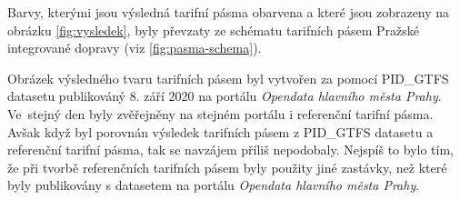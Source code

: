 Barvy, kterými jsou výsledná tarifní pásma obarvena a které jsou zobrazeny na obrázku \ref{fig:vysledek}, byly převzaty
ze schématu tarifních pásem Pražské integrované dopravy (viz \ref{fig:pasma-schema}).  

Obrázek výsledného tvaru tarifních pásem byl vytvořen za pomocí PID\_GTFS datasetu publikováný 8. září 2020 na portálu \textit{Opendata
hlavního města Prahy}. Ve~stejný den byly zvěřejněny na stejném portálu i referenční tarifní pásma.
Avšak když byl porovnán výsledek tarifních pásem z PID\_GTFS datasetu a referenční tarifní pásma, tak
se navzájem příliš nepodobaly. Nejspíš to bylo tím, že při tvorbě referenčních tarifních pásem byly použity jiné zastávky,
než které byly publikovány s datasetem na portálu \textit{Opendata hlavního města Prahy}.
